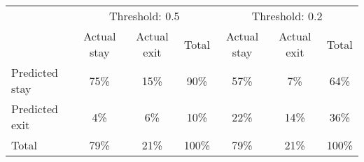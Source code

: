 \begin{tabular}{l|ccc|ccc}
\toprule
 & \multicolumn{3}{c|}{Threshold: 0.5} & \multicolumn{3}{c}{Threshold: 0.2}  \\
 & Actual stay & Actual exit & Total & Actual stay & Actual exit & Total \\
\midrule
Predicted stay  & 75\% & 15\% & 90\% & 57\% & 7\% & 64\% \\
Predicted exit &  4\% &  6\% & 10\% & 22\% & 14\% & 36\% \\
\midrule
Total & 79\% & 21\% & 100\% & 79\% & 21\% & 100\% \\
\bottomrule
\end{tabular}

